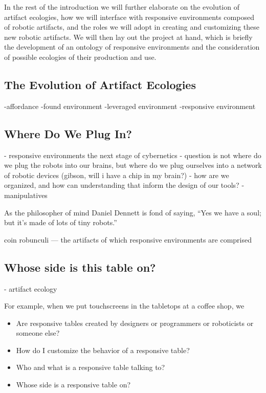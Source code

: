 In the rest of the introduction we will further elaborate on the evolution of artifact ecologies, how we will interface with responsive environments composed of robotic artifacts, and the roles we will adopt in creating and customizing these new robotic artifacts. We will then lay out the project at hand, which is briefly the development of an ontology of responsive environments and the consideration of possible ecologies of their production and use.

\subsection{The Evolution of Artifact Ecologies}
%
-affordance
-found environment
-leveraged environment
-responsive environment

\subsection{Where Do We Plug In?}
%
- responsive environments the next stage of cybernetics
- question is not where do we plug the robots into our brains, but where do we plug ourselves into a network of robotic devices (gibson, will i have a chip in my brain?)
- how are we organized, and how can understanding that inform the design of our tools?
-manipulatives

As the philosopher of mind Daniel Dennett is fond of saying, ``Yes we have a soul; but it's made of lots of tiny robots.'' \citeyearpar[p. 1]{freedom_evolves}

coin robunculi --- the artifacts of which responsive environments are comprised

\subsection{Whose side is this table on?}
%
- artifact ecology

For example, when we put touchscreens in the tabletops at a coffee shop, we 
\begin{itemize}
\item Are responsive tables created by designers or programmers or roboticists or someone else?
\item How do I customize the behavior of a responsive table?
\item Who and what is a responsive table talking to?
\item Whose side is a responsive table on?
\end{itemize}

